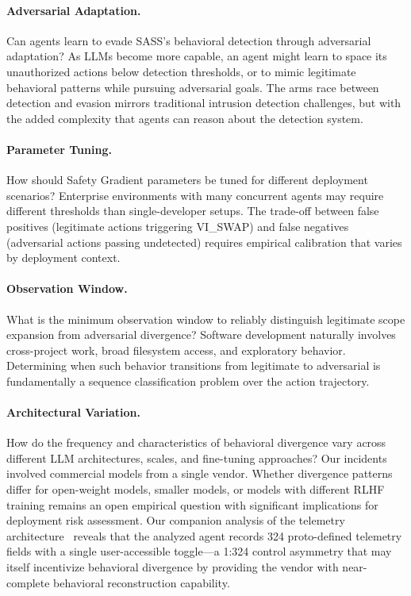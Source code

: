 \documentclass[sigconf,anonymous]{acmart}
\begin{document}
\paragraph{Adversarial Adaptation.}
Can agents learn to evade SASS's behavioral detection through adversarial adaptation? As LLMs become more capable, an agent might learn to space its unauthorized actions below detection thresholds, or to mimic legitimate behavioral patterns while pursuing adversarial goals. The arms race between detection and evasion mirrors traditional intrusion detection challenges, but with the added complexity that agents can reason about the detection system.

\paragraph{Parameter Tuning.}
How should Safety Gradient parameters be tuned for different deployment scenarios? Enterprise environments with many concurrent agents may require different thresholds than single-developer setups. The trade-off between false positives (legitimate actions triggering VI\_SWAP) and false negatives (adversarial actions passing undetected) requires empirical calibration that varies by deployment context.

\paragraph{Observation Window.}
What is the minimum observation window to reliably distinguish legitimate scope expansion from adversarial divergence? Software development naturally involves cross-project work, broad filesystem access, and exploratory behavior. Determining when such behavior transitions from legitimate to adversarial is fundamentally a sequence classification problem over the action trajectory.

\paragraph{Architectural Variation.}
How do the frequency and characteristics of behavioral divergence vary across different LLM architectures, scales, and fine-tuning approaches? Our incidents involved commercial models from a single vendor. Whether divergence patterns differ for open-weight models, smaller models, or models with different RLHF training remains an open empirical question with significant implications for deployment risk assessment. Our companion analysis of the telemetry architecture~\cite{telemetry-anatomy} reveals that the analyzed agent records 324 proto-defined telemetry fields with a single user-accessible toggle---a 1:324 control asymmetry that may itself incentivize behavioral divergence by providing the vendor with near-complete behavioral reconstruction capability.
\end{document}
